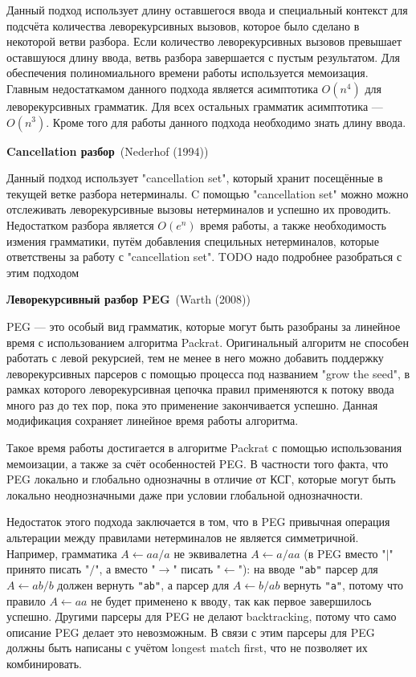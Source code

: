 \documentclass[times]{itmo-student-thesis}
\begin{document}
Данный подход использует длину оставшегося ввода и специальный контекст для подсчёта количества леворекурсивных вызовов, которое
было сделано в некоторой ветви разбора. Если количество леворекурсивных вызовов превышает оставшуюся длину ввода, ветвь разбора
завершается с пустым результатом. Для обеспечения полиномиального времени работы используется мемоизация. Главным недостаткамом данного 
подхода является асимптотика $O(n^4)$ для леворекурсивных грамматик. Для всех остальных грамматик асимптотика --- $O(n^3)$. Кроме
того для работы данного подхода необходимо знать длину ввода.

\textbf{Cancellation разбор}~(Nederhof (1994)\cite{nederhof_linguistic_1994})
    
Данный подход использует "cancellation set", который хранит посещённые в текущей ветке разбора нетерминалы. C помощью "cancellation set"
можно можно отслеживать леворекурсивные вызовы нетерминалов и успешно их проводить. Недостатком разбора является $O(e^n)$ время работы,
а также необходимость измения грамматики, путём добавления специльных нетерминалов, которые ответствены за работу с "cancellation set".
TODO надо подробнее разобраться с этим подходом

\textbf{Леворекурсивный разбор PEG}~(Warth (2008)\cite{warth_packrat_2008})

PEG --- это особый вид грамматик, которые могут быть разобраны за линейное время с использованием алгоритма
Packrat\cite{ford_parsing_nodate}. Оригинальный алгоритм не способен работать с левой рекурсией, тем не менее в него можно
добавить поддержку леворекурсивных парсеров с помощью процесса под названием "grow the seed"\cite{warth_packrat_2008}, в
рамках которого леворекурсивная цепочка правил применяются к потоку ввода много раз до тех пор, пока это применение
закончивается успешно. Данная модификация сохраняет линейное время работы алгоритма. 

Такое время работы достигается в алгоритме Packrat с помощью использования мемоизации, а также за счёт особенностей
PEG. В частности того факта, что PEG локально и глобально однозначны в отличие от КСГ, которые могут быть локально
неоднозначными даже при условии глобальной однозначности.

Недостаток этого подхода заключается в том, что в PEG привычная операция альтерации между правилами нетерминалов не
является симметричной. Например, грамматика $A \leftarrow aa / a$ не эквивалетна $A \leftarrow a / aa$ (в PEG вместо
"$|$"{} принято писать "$/$"{}, а вместо "$\to$"{} писать "$\leftarrow$"):
на вводе \lstinline{"ab"} парсер для $A \leftarrow ab / b$ должен вернуть \lstinline{"ab"}, а парсер для
$A \leftarrow b / ab$ вернуть \lstinline{"a"}, потому что правило $A \leftarrow aa$ не будет применено к вводу,
так как первое завершилось успешно. Другими парсеры для PEG не делают backtracking, потому что само описание PEG делает
это невозможным. В связи с этим парсеры для PEG должны быть написаны с учётом longest match first, что не позволяет их
комбинировать.
\end{document}
